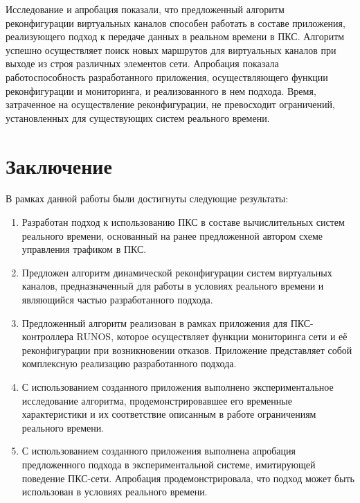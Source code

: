 \documentclass[12pt, a4paper]{article}
\begin{document}
Исследование и апробация показали, что предложенный алгоритм реконфигурации виртуальных каналов способен работать в составе приложения, реализующего подход к передаче данных в реальном времени в ПКС. Алгоритм успешно осуществляет поиск новых маршрутов для виртуальных каналов при выходе из строя различных элементов сети. Апробация показала работоспособность разработанного приложения, осуществляющего функции реконфигурации и мониторинга, и реализованного в нем подхода. Время, затраченное на осуществление реконфигурации, не превосходит ограничений, установленных для существующих систем реального времени.

\section*{Заключение}

В рамках данной работы были достигнуты следующие результаты:
\begin{enumerate}
	\item Разработан подход к использованию ПКС в составе вычислительных систем реального времени, основанный на ранее предложенной автором схеме управления трафиком в ПКС.
	\item Предложен алгоритм динамической реконфигурации систем виртуальных каналов, предназначенный для работы в условиях реального времени и являющийся частью разработанного подхода.
	\item Предложенный алгоритм реализован в рамках приложения для ПКС-контроллера RUNOS, которое осуществляет функции мониторинга сети и её реконфигурации при возникновении отказов. Приложение представляет собой комплексную реализацию разработанного подхода.
	\item С использованием созданного приложения выполнено экспериментальное исследование алгоритма, продемонстрировавшее его временные характеристики и их соответствие описанным в работе ограничениям реального времени.
	\item С использованием созданного приложения выполнена апробация предложенного подхода в экспериментальной системе, имитирующей поведение ПКС-сети. Апробация продемонстрировала, что подход может быть использован в условиях реального времени.
\end{enumerate}
\end{document}
